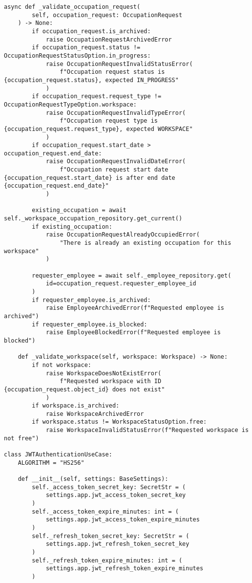 \begin{lstlisting}[style=pythonstyle]
    async def _validate_occupation_request(
        self, occupation_request: OccupationRequest
    ) -> None:
        if occupation_request.is_archived:
            raise OccupationRequestArchivedError
        if occupation_request.status != OccupationRequestStatusOption.in_progress:
            raise OccupationRequestInvalidStatusError(
                f"Occupation request status is {occupation_request.status}, expected IN_PROGRESS"
            )
        if occupation_request.request_type != OccupationRequestTypeOption.workspace:
            raise OccupationRequestInvalidTypeError(
                f"Occupation request type is {occupation_request.request_type}, expected WORKSPACE"
            )
        if occupation_request.start_date > occupation_request.end_date:
            raise OccupationRequestInvalidDateError(
                f"Occupation request start date {occupation_request.start_date} is after end date {occupation_request.end_date}"
            )

        existing_occupation = await self._workspace_occupation_repository.get_current()
        if existing_occupation:
            raise OccupationRequestAlreadyOccupiedError(
                "There is already an existing occupation for this workspace"
            )

        requester_employee = await self._employee_repository.get(
            id=occupation_request.requester_employee_id
        )
        if requester_employee.is_archived:
            raise EmployeeArchivedError(f"Requested employee is archived")
        if requester_employee.is_blocked:
            raise EmployeeBlockedError(f"Requested employee is blocked")

    def _validate_workspace(self, workspace: Workspace) -> None:
        if not workspace:
            raise WorkspaceDoesNotExistError(
                f"Requested workspace with ID {occupation_request.object_id} does not exist"
            )
        if workspace.is_archived:
            raise WorkspaceArchivedError
        if workspace.status != WorkspaceStatusOption.free:
            raise WorkspaceInvalidStatusError(f"Requested workspace is not free")

class JWTAuthenticationUseCase:
    ALGORITHM = "HS256"

    def __init__(self, settings: BaseSettings):
        self._access_token_secret_key: SecretStr = (
            settings.app.jwt_access_token_secret_key
        )
        self._access_token_expire_minutes: int = (
            settings.app.jwt_access_token_expire_minutes
        )
        self._refresh_token_secret_key: SecretStr = (
            settings.app.jwt_refresh_token_secret_key
        )
        self._refresh_token_expire_minutes: int = (
            settings.app.jwt_refresh_token_expire_minutes
        )


\end{lstlisting}

